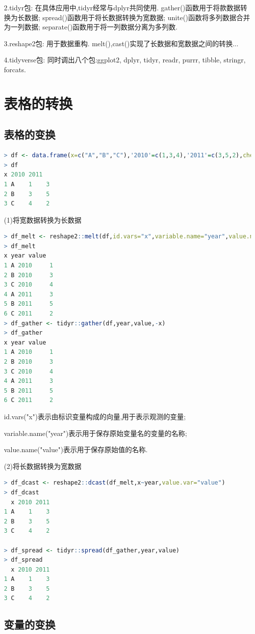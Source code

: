 \documentclass[11pt,a4paper,oneside]{book}
\begin{document}
2.tidyr包: 在具体应用中,tidyr经常与dplyr共同使用. gather()函数用于将款数据转换为长数据; spread()函数用于将长数据转换为宽数据; unite()函数将多列数据合并为一列数据; separate()函数用于将一列数据分离为多列数.

3.reshape2包: 用于数据重构. melt(),cast()实现了长数据和宽数据之间的转换...

4.tidyverse包: 同时调出八个包:ggplot2, dplyr, tidyr, readr, purrr, tibble, stringr, forcats. 

\section{表格的转换}
\subsection{表格的变换}

\begin{lstlisting}[language=r]
> df <- data.frame(x=c("A","B","C"),'2010'=c(1,3,4),'2011'=c(3,5,2),check.names = FALSE)
> df
x 2010 2011
1 A    1    3
2 B    3    5
3 C    4    2
\end{lstlisting}

(1)将宽数据转换为长数据
\begin{lstlisting}[language=r]
> df_melt <- reshape2::melt(df,id.vars="x",variable.name="year",value.name="value")
> df_melt
x year value
1 A 2010     1
2 B 2010     3
3 C 2010     4
4 A 2011     3
5 B 2011     5
6 C 2011     2
> df_gather <- tidyr::gather(df,year,value,-x)
> df_gather
x year value
1 A 2010     1
2 B 2010     3
3 C 2010     4
4 A 2011     3
5 B 2011     5
6 C 2011     2
\end{lstlisting}

id.vars("x")表示由标识变量构成的向量,用于表示观测的变量;

variable.name("year")表示用于保存原始变量名的变量的名称;

value.name("value")表示用于保存原始值的名称.

(2)将长数据转换为宽数据
\begin{lstlisting}[language=r]
> df_dcast <- reshape2::dcast(df_melt,x~year,value.var="value")
> df_dcast
  x 2010 2011
1 A    1    3
2 B    3    5
3 C    4    2

> df_spread <- tidyr::spread(df_gather,year,value)
> df_spread
  x 2010 2011
1 A    1    3
2 B    3    5
3 C    4    2
\end{lstlisting}

\subsection{变量的变换}
\end{document}
